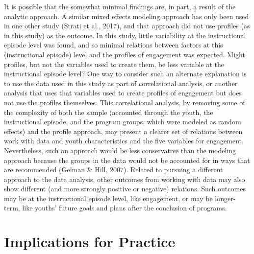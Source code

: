 \documentclass[]{msu-thesis}
\theoremstyle{definition}
\theoremstyle{definition}
\theoremstyle{definition}
\theoremstyle{remark}
\begin{document}
It is possible that the somewhat minimal findings are, in part, a result
of the analytic approach. A similar mixed effects modeling approach has
only been used in one other study (Strati et al., 2017), and that
approach did not use profiles (as in this study) as the outcome. In this
study, little variability at the instructional episode level was found,
and so minimal relations between factors at this (instructional episode)
level and the profiles of engagement was expected. Might profiles, but
not the variables used to create them, be less variable at the
instructional episode level? One way to consider such an alternate
explanation is to use the data used in this study as part of
correlational analysis, or another analysis that uses that variables
used to create profiles of engagement but does not use the profiles
themselves. This correlational analysis, by removing some of the
complexity of both the sample (accounted through the youth, the
instructional episode, and the program groups, which were modeled as
random effects) and the profile approach, may present a clearer set of
relations between work with data and youth characteristics and the five
variables for engagement. Nevertheless, such an approach would be less
conservative than the modeling approach because the groups in the data
would not be accounted for in ways that are recommended (Gelman \& Hill,
2007). Related to pursuing a different approach to the data analysis,
other outcomes from working with data may also show different (and more
strongly positive or negative) relations. Such outcomes may be at the
instructional episode level, like engagement, or may be longer-term,
like youths' future goals and plans after the conclusion of programs.

\section{Implications for Practice}\label{implications-for-practice}
\end{document}
